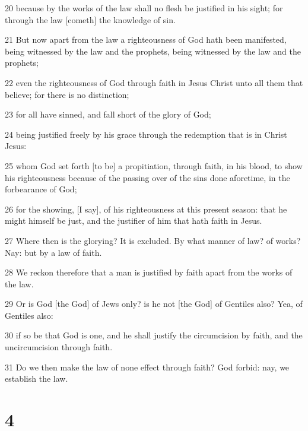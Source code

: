 \par 20 because by the works of the law shall no flesh be justified in his sight; for through the law [cometh] the knowledge of sin.
\par 21 But now apart from the law a righteousness of God hath been manifested, being witnessed by the law and the prophets, being witnessed by the law and the prophets;
\par 22 even the righteousness of God through faith in Jesus Christ unto all them that believe; for there is no distinction;
\par 23 for all have sinned, and fall short of the glory of God;
\par 24 being justified freely by his grace through the redemption that is in Christ Jesus:
\par 25 whom God set forth [to be] a propitiation, through faith, in his blood, to show his righteousness because of the passing over of the sins done aforetime, in the forbearance of God;
\par 26 for the showing, [I say], of his righteousness at this present season: that he might himself be just, and the justifier of him that hath faith in Jesus.
\par 27 Where then is the glorying? It is excluded. By what manner of law? of works? Nay: but by a law of faith.
\par 28 We reckon therefore that a man is justified by faith apart from the works of the law.
\par 29 Or is God [the God] of Jews only? is he not [the God] of Gentiles also? Yea, of Gentiles also:
\par 30 if so be that God is one, and he shall justify the circumcision by faith, and the uncircumcision through faith.
\par 31 Do we then make the law of none effect through faith? God forbid: nay, we establish the law.

\chapter{4}


